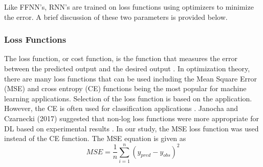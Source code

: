 Like FFNN's, RNN's are trained on loss functions using optimizers to minimize the error. A brief discussion of these two parameters is provided below.

\subsubsection{Loss Functions}

The loss function, or cost function, is the function that measures the error between the predicted output and the desired output \citep{Goodfellow2016}. In optimization theory, there are many loss functions that can be used including the Mean Square Error (MSE) and cross entropy (CE) functions being the most popular for machine learning applications.  Selection of the loss function is based on the application. However, the CE is often used for classification applications \citep{Kline2005, Wu2017}. Janocha and Czarnecki (2017) suggested that non-log loss functions were more appropriate for DL based on experimental results \citep{Janocha2017}. In our study, the MSE loss function was used instead of the CE function. The MSE equation is given as 
%
\begin{equation}
\label{eq:MSE}
MSE = \frac{1}{n} \sum_{i=1}^{n} \left( y_{pred} - y_{obs} \right)^{2}
\end{equation}
%
